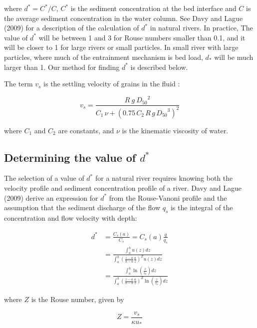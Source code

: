 \documentclass[11pt]{article}
\begin{document}
\noindent where $d^* = C^* / C$, $C^*$ is the sediment concentration at the bed interface and $C$ is the average sediment concentration in the water column. See Davy and Lague (2009) for a description of the calculation of $d^*$ in natural rivers. In practice, The value of $d^*$ will be between 1 and 3 for Rouse numbers smaller than 0.1, and it will be closer to 1 for large rivers or small particles. In small river with large particles, where much of the entrainment mechanism is bed load, $d_*$ will be much larger than 1. Our method for finding $d^*$ is described below.

The term $v_s$ is the settling velocity of grains in the fluid \citep{ferguson2004simple}:

\begin{equation}
v_s = \frac{R \: g \: {D_{50}}^2}{C_1 \, \nu + (0.75 \, C_2 \, R \, g \, {D_{50}}^3)^2}
\end{equation}

\noindent where $C_1$ and $C_2$ are constants, and $\nu$ is the kinematic viscosity of water. 

\subsection{Determining the value of $d^*$}
The selection of a value of $d^*$ for a natural river requires knowing both the velocity profile and sediment concentration profile of a river. Davy and Lague (2009) derive an expression for $d^*$ from the Rouse-Vanoni profile and the assumption that the sediment discharge of the flow $q_s$ is the integral of the concentration and flow velocity with depth:

\begin{equation}
\begin{split}
d^* & = \frac{C_s(a)}{C_s} = C_s(a) \frac{q}{q_s} \\
& = \frac{\int_{a}^{h} u(z) dz}{\int_{a}^{h} (\frac{z-a}{h-a}\frac{a}{z})^Z u(z) dz} \\
& = \frac{\int_{a}^{h} \ln{(\frac{z}{z_o})} dz}{\int_{a}^{h} (\frac{z-a}{h-a}\frac{a}{z})^Z \ln{(\frac{z}{z_o})} dz}
\end{split}
\end{equation} 

\noindent where $Z$ is the Rouse number, given by

\begin{equation}
Z = \frac{v_s}{\kappa u_*}
\end{equation}
\end{document}
